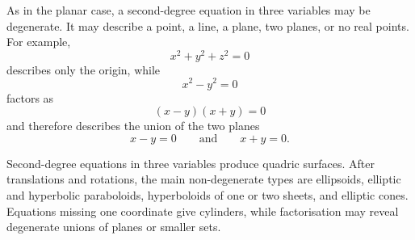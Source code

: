 As in the planar case, a second-degree equation in three variables may be
degenerate. It may describe a point, a line, a plane, two planes, or no real
points. For example,
\[
x^2+y^2+z^2=0
\]
describes only the origin, while
\[
x^2-y^2=0
\]
factors as
\[
(x-y)(x+y)=0
\]
and therefore describes the union of the two planes
\[
x-y=0
\qquad\text{and}\qquad
x+y=0.
\]

\begin{summarybox}
Second-degree equations in three variables produce quadric surfaces. After
translations and rotations, the main non-degenerate types are ellipsoids,
elliptic and hyperbolic paraboloids, hyperboloids of one or two sheets, and
elliptic cones. Equations missing one coordinate give cylinders, while
factorisation may reveal degenerate unions of planes or smaller sets.
\end{summarybox}
